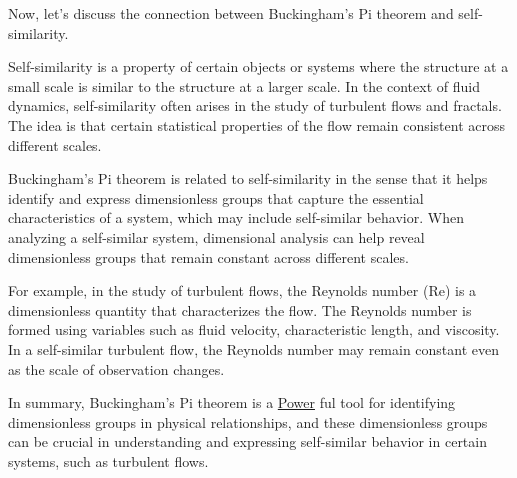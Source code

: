 Now, let's discuss the connection between Buckingham's Pi theorem and self-similarity.

Self-similarity is a property of certain objects or systems where the structure at a small scale is similar to the structure at a larger scale. In the context of fluid dynamics, self-similarity often arises in the study of turbulent flows and fractals. The idea is that certain statistical properties of the flow remain consistent across different scales.

Buckingham's Pi theorem is related to self-similarity in the sense that it helps identify and express dimensionless groups that capture the essential characteristics of a system, which may include self-similar behavior. When analyzing a self-similar system, dimensional analysis can help reveal dimensionless groups that remain constant across different scales.

For example, in the study of turbulent flows, the Reynolds number (Re) is a dimensionless quantity that characterizes the flow. The Reynolds number is formed using variables such as fluid velocity, characteristic length, and viscosity. In a self-similar turbulent flow, the Reynolds number may remain constant even as the scale of observation changes.

In summary, Buckingham's Pi theorem is a \href{https://mathworld.wolfram.com/Power.html}{Power} ful tool for identifying dimensionless groups in physical relationships, and these dimensionless groups can be crucial in understanding and expressing self-similar behavior in certain systems, such as turbulent flows.

